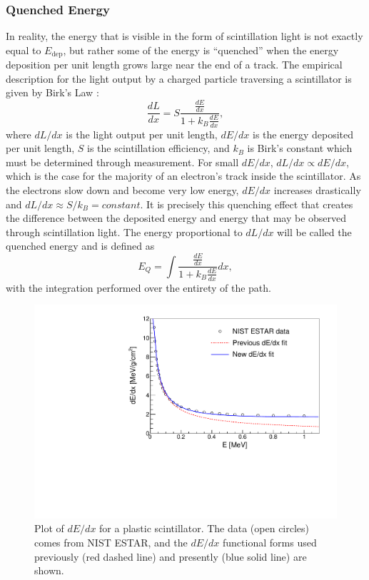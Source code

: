 \subsubsection{Quenched Energy} \label{sssec:Equenched}
In reality, the energy that is visible in the form of scintillation light is not exactly
equal to $E_{\mathrm{dep}}$, but rather some of the energy is ``quenched'' when
the energy deposition per unit length grows large near the end of a track. The
empirical description for the light output by a charged particle traversing a
scintillator is given by Birk's Law \cite{birks1951scintillations}:
%
\begin{equation}
  \frac{dL}{dx} = S\frac{\frac{dE}{dx}}{1+k_B\frac{dE}{dx}},
\end{equation}
%
where $dL/dx$ is the light output per unit length, $dE/dx$ is the energy deposited per unit
length, $S$ is the scintillation efficiency, and $k_B$ is Birk's constant which must be
determined through measurement. For small $dE/dx$,
$dL/dx \propto dE/dx$, which is the case for the majority of an electron's track inside the scintillator.
As the electrons slow down and become very low energy, $dE/dx$ increases drastically
and $dL/dx \approx S/k_B = constant$. It is precisely this quenching effect that creates the difference
between the deposited energy and energy that may be observed through scintillation light. The energy
proportional to $dL/dx$ will be called the quenched energy and is defined as
%
\begin{equation}
  E_Q = \int \frac{\frac{dE}{dx}}{1+k_B\frac{dE}{dx}}dx,
\end{equation}
%
with the integration performed over the entirety of the path.

\begin{figure}[h] 
\centering
\includegraphics[scale=.6]{3-UCNAAnalysis/dEdx.pdf}
\caption{Plot of $dE/dx$ for a plastic scintillator. The data (open circles) comes from NIST ESTAR,
  and the $dE/dx$ functional forms used previously (red dashed line) and presently (blue solid line)
  are shown.}
\label{fig:dEdx}
\end{figure}

